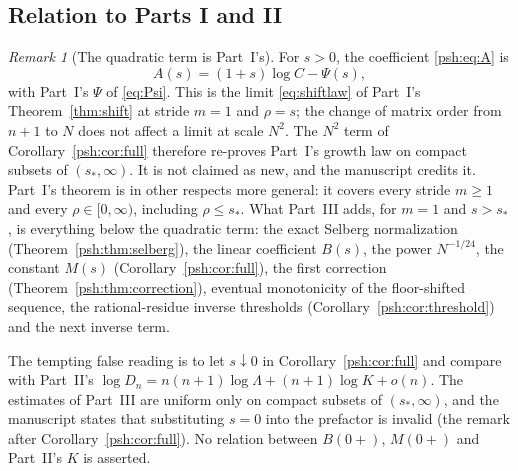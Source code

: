 \documentclass[11pt,a4paper]{article}
\numberwithin{equation}{section}
\theoremstyle{remark}\newtheorem{remark}[theorem]{Remark}
\begin{document}
\subsection{Relation to Parts I and II}
\label{psh:sec:relation}
\begin{remark}[The quadratic term is Part~I's]\label{psh:rem:partI}
For $s>0$, the coefficient \eqref{psh:eq:A} is
\[
 A(s)=(1+s)\log C-\Psi(s),
\]
with Part~I's $\Psi$ of \eqref{eq:Psi}. This is the limit
\eqref{eq:shiftlaw} of Part~I's Theorem~\ref{thm:shift} at stride $m=1$ and
$\rho=s$; the change of matrix order from $n+1$ to $N$ does not affect a
limit at scale $N^2$. The $N^2$ term of Corollary~\ref{psh:cor:full}
therefore re-proves Part~I's growth law on compact subsets of
$(s_*,\infty)$. It is not claimed as new, and the manuscript credits it.
Part~I's theorem is in other respects more general: it covers every stride
$m\geq1$ and every $\rho\in[0,\infty)$, including $\rho\leq s_*$.
What Part~III adds, for $m=1$ and $s>s_*$, is everything below the
quadratic term: the exact Selberg normalization
(Theorem~\ref{psh:thm:selberg}), the linear coefficient $B(s)$, the power
$N^{-1/24}$, the constant $M(s)$ (Corollary~\ref{psh:cor:full}), the first
correction (Theorem~\ref{psh:thm:correction}), eventual monotonicity of the
floor-shifted sequence, the rational-residue inverse thresholds
(Corollary~\ref{psh:cor:threshold}) and the next inverse term.
\end{remark}

\noindent The tempting false reading is to let $s\downarrow0$ in
Corollary~\ref{psh:cor:full} and compare with Part~II's
$\log D_n=n(n+1)\log\Lambda+(n+1)\log K+o(n)$. The estimates of Part~III are
uniform only on compact subsets of $(s_*,\infty)$, and the manuscript states
that substituting $s=0$ into the prefactor is invalid (the remark after
Corollary~\ref{psh:cor:full}). No relation between $B(0+)$, $M(0+)$ and
Part~II's $K$ is asserted.
\end{document}
